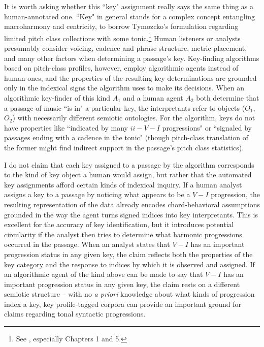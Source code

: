 It is worth asking whether this ``key" assignment really says the same thing as a human-annotated one.  ``Key" in general stands for a complex concept entangling macroharmony and centricity, to borrow Tymozcko's formulation regarding limited pitch class collections with some tonic.\footnote{See \cite{tymoczko2010}, especially Chapters 1 and 5.}  Human listeners or analysts presumably consider voicing, cadence and phrase structure, metric placement, and many other factors when determining a passage's key.  Key-finding algorithms based on pitch-class profiles, however, employ algorithmic agents instead of human ones, and the properties of the resulting key determinations are grounded only in the indexical signs the algorithm uses to make its decisions.  When an algorithmic key-finder of this kind $A_1$ and a human agent $A_2$ both determine that a passage of music ``is in" a particular key, the interpretants refer to objects ($O_1$, $O_2$) with necessarily different semiotic ontologies.  For the algorithm, keys do not have properties like ``indicated by many $ii-V-I$ progressions" or ``signaled by passages ending with a cadence in the tonic" (though pitch-class translation of the former might find indirect support in the passage's pitch class statistics).

I do not claim that each key assigned to a passage by the algorithm corresponds to the kind of key object a human would assign, but rather that the automated key assignments afford certain kinds of indexical inquiry.  If a human analyst assigns a key to a passage by noticing what appears to be a $V-I$ progression, the resulting representation of the data already encodes chord-behavioral assumptions grounded in the way the agent turns signed indices into key interpretants.  This is excellent for the accuracy of key identification, but it introduces potential circularity if the analyst then tries to determine what harmonic progressions occurred in the passage.  When an analyst states that $V-I$ has an important progression status in any given key, the claim reflects both the properties of the key category and the response to indices by which it is observed and assigned.  If an algorithmic agent of the kind above can be made to say that $V-I$ has an important progression status in any given key, the claim rests on a different semiotic structure -- with no \emph{a priori} knowledge about what kinds of progression index a key, key profile-tagged corpora can provide an important ground for claims regarding tonal syntactic progressions.

